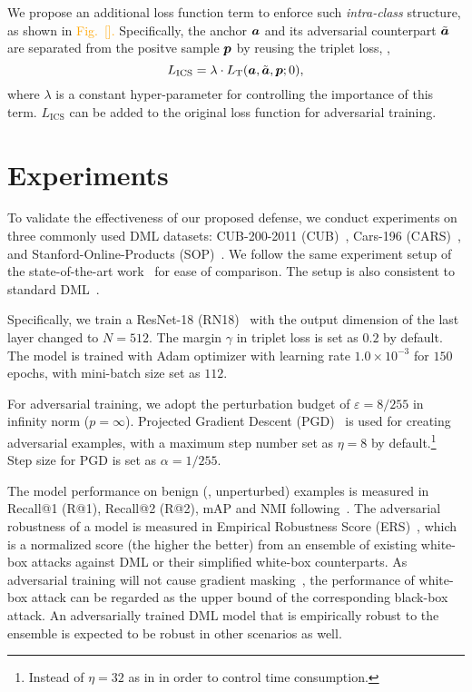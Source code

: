 \documentclass[10pt,twocolumn,letterpaper]{article}
\newcommand{\oo}[1]{\textcolor{orange}{#1}}
\begin{document}

We propose an additional loss function term to enforce such \emph{intra-class}
structure, as shown in \oo{Fig.~[].}
%
Specifically, the anchor ${\bm{a}}$ and its adversarial counterpart $\tilde{{\bm{a}}}$
are separated from the positve sample ${\bm{p}}$ by reusing the triplet loss,
\ie,
%
\begin{equation}
	L_\text{ICS} = \lambda \cdot L_\text{T}(
	{\bm{a}}, \tilde{{\bm{a}}}, {\bm{p}}; 0),
\end{equation}
%
where $\lambda$ is a constant hyper-parameter for controlling the importance
of this term.
%
$L_\text{ICS}$ can be added to the original loss function for adversarial training.


\section{Experiments}
\label{sec:4}

To validate the effectiveness of our proposed defense, we conduct experiments
on three commonly used DML datasets: CUB-200-2011 (CUB)~\cite{cub200}, Cars-196
(CARS)~\cite{cars196}, and Stanford-Online-Products (SOP)~\cite{sop}.
%
We follow the same experiment setup of the state-of-the-art work~\cite{robrank}
for ease of comparison.
%
The setup is also consistent to standard DML~\cite{revisiting}.

Specifically, we train a ResNet-18 (RN18)~\cite{resnet} with the output dimension of
the last layer changed to $N=512$.
%
The margin $\gamma$ in triplet loss is set as $0.2$ by default.
%
The model is trained with Adam optimizer with learning rate $1.0\times 10^{-3}$
for $150$ epochs, with mini-batch size set as $112$.

For adversarial training, we adopt the perturbation budget of
$\varepsilon=8/255$ in infinity norm ($p=\infty$).
%
Projected Gradient Descent (PGD)~\cite{madry} is used for creating adversarial
examples, with a maximum step number set as $\eta=8$ by default.\footnote{
Instead of $\eta=32$ as in \cite{robrank} in order to control time consumption.}
%
Step size for PGD is set as $\alpha=1/255$.

The model performance on benign (\ie, unperturbed) examples is measured in
Recall@1 (R@1), Recall@2 (R@2), mAP and NMI
following~\cite{revisiting,robrank}.
%
The adversarial robustness of a model is measured in Empirical Robustness Score
(ERS)~\cite{robrank}, which is a normalized score (the higher the better) from
an ensemble of existing white-box attacks against DML or their simplified
white-box counterparts.
%
As adversarial training will not cause gradient masking~\cite{obfuscated},
the performance of white-box attack can be regarded as the upper bound of the
corresponding black-box attack.
%
An adversarially trained DML model that is empirically robust to the ensemble
is expected to be robust in other scenarios as well.
\end{document}
